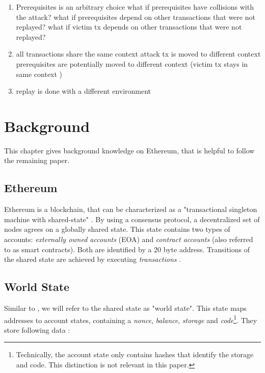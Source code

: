 \documentclass[draft,final]{vutinfth} %
\begin{document}
\begin{enumerate}
    \item Prerequisites is an arbitrary choice
          \subitem what if prerequisites have collisions with the attack?
          \subitem what if prerequisites depend on other transactions that were not replayed?
          \subitem what if victim tx depends on other transactions that were not replayed?
    \item all transactions share the same context
          \subitem attack tx is moved to different context
          \subitem prerequisites are potentially moved to different context
          \subitem (victim tx stays in same context \checkmark)
    \item replay is done with a different environment
\end{enumerate}

\chapter{Background}

This chapter gives background knowledge on Ethereum, that is helpful to follow the remaining paper.

\section{Ethereum}

Ethereum is a blockchain, that can be characterized as a "transactional singleton machine with shared-state" \cite{wood_ethereum_2014}. By using a consensus protocol, a decentralized set of nodes agrees on a globally shared state. This state contains two types of accounts: \emph{externally owned accounts} (EOA) and \emph{contract accounts} (also referred to as smart contracts). Both are identified by a 20 byte address. Transitions of the shared state are achieved by executing \emph{transactions} \cite{tikhomirov_ethereum_2018}.

\section{World State}

Similar to \cite{wood_ethereum_2014}, we will refer to the shared state as "world state". This state maps addresses to account states, containing a \emph{nonce}, \emph{balance}, \emph{storage} and \emph{code}\footnote{Technically, the account state only contains hashes that identify the storage and code. This distinction is not relevant in this paper.}. They store following data \cite{wood_ethereum_2014}:
\end{document}
